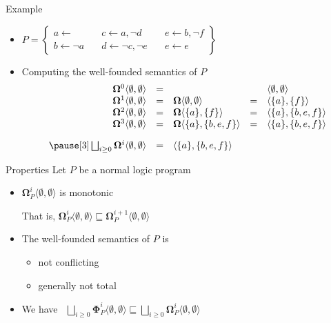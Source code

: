 \begin{frame}{Example}
  \bigskip
  \begin{itemize}
  \item<1->
    \(
    P
    =
    \left\{
      \begin{array}{lll}
        a \leftarrow                \quad &
        c \leftarrow a, \neg d      \quad &
        e \leftarrow b, \neg f
        \\
        b \leftarrow \neg a         \quad &
        d \leftarrow \neg c, \neg e \quad &
        e \leftarrow e
      \end{array}
    \right\}
    \)
  \bigskip
  \item<2-> Computing the well-founded semantics of $P$
    \[
    \begin{array}{rclcl}
      \mathbf{\Omega}^0\langle\emptyset,\emptyset\rangle&=&                                                & &\langle\emptyset,\emptyset\rangle
      \\
      \mathbf{\Omega}^1\langle\emptyset,\emptyset\rangle&=&\mathbf{\Omega}\langle\emptyset,\emptyset\rangle&=&\langle\{a\}    ,\{f\}    \rangle
      \\
      \mathbf{\Omega}^2\langle\emptyset,\emptyset\rangle&=&\mathbf{\Omega}\langle\{a\}    ,\{f\}    \rangle&=&\langle\{a\}    ,\{b,e,f\}\rangle
      \\
      \mathbf{\Omega}^3\langle\emptyset,\emptyset\rangle&=&\mathbf{\Omega}\langle\{a\}    ,\{b,e,f\}\rangle&=&\langle\{a\}    ,\{b,e,f\}\rangle
      \\[10pt]\pause[3]
      \bigsqcup_{i \geq 0}\mathbf{\Omega}^i\langle\emptyset,\emptyset\rangle&=&\langle\{a\},\{b,e,f\}\rangle
    \end{array}
    \]
  \end{itemize}
\end{frame}
\begin{frame}{Properties}
  \bigskip
  Let $P$ be a normal logic program
  \medskip
  \begin{itemize}
  \item ${\mathbf{\Omega}}_P^i\langle \emptyset, \emptyset \rangle$ is monotonic
    \smallskip

    That is,
    \(
    {\mathbf{\Omega}}_P^i\langle \emptyset, \emptyset \rangle
    \sqsubseteq
    {\mathbf{\Omega}}_P^{i+1}\langle \emptyset, \emptyset \rangle
    \)
    \medskip
  \item The well-founded semantics of $P$ is
    \begin{itemize}\normalsize
    \item not conflicting
    \item generally not total
    \end{itemize}
    \smallskip
  \item We have \
    \(
    \bigsqcup_{i \geq 0}
    {\mathbf{\Phi}}_P^i \langle \emptyset, \emptyset \rangle
    \sqsubseteq
    \bigsqcup_{i \geq 0} {\mathbf{\Omega}}_P^i \langle
    \emptyset, \emptyset \rangle
    \)
  \end{itemize}
\end{frame}
